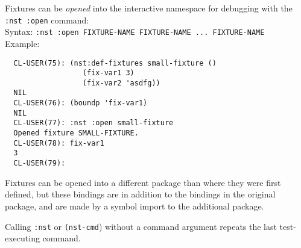 Fixtures can be \emph{opened} into the
interactive namespace for debugging with the
\texttt{:nst~:open} command:%
\\ Syntax: \texttt{:nst :open FIXTURE-NAME FIXTURE-NAME ... FIXTURE-NAME}
\\ Example:
\begin{verbatim}
  CL-USER(75): (nst:def-fixtures small-fixture ()
                  (fix-var1 3)
                  (fix-var2 'asdfg))
  NIL
  CL-USER(76): (boundp 'fix-var1)
  NIL
  CL-USER(77): :nst :open small-fixture
  Opened fixture SMALL-FIXTURE.
  CL-USER(78): fix-var1
  3
  CL-USER(79): 
\end{verbatim}
Fixtures can be opened into a different package than where they were
first defined, but these bindings are in addition to the bindings in
the original package, and are made by a symbol import to the
additional package.

Calling \texttt{:nst} or \texttt{(nst-cmd}) without a command argument
repeats the last test-executing command.

